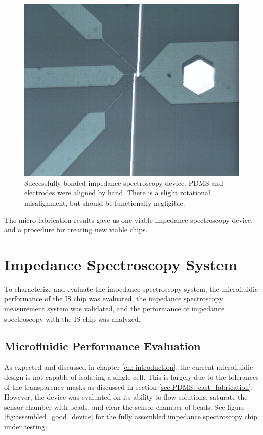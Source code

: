 \begin{figure}[h]
    \centering
    \includegraphics[width=\textwidth]{images/good_device.png}
    \caption{Successfully bonded impedance spectroscopy device. PDMS and electrodes were aligned by hand. There is a slight rotational misalignment, but should be functionally negligible.}
    \label{fig:good_device}
\end{figure}

\par The micro-fabrication results gave us one viable impedance spectroscopy device, and a procedure for creating new viable chips.

\FloatBarrier

\section{Impedance Spectroscopy System}

\par To characterize and evaluate the impedance spectroscopy system, the microfluidic performance of the IS chip was evaluated, the impedance spectroscopy measurement system was validated, and the performance of impedance spectroscopy with the IS chip was analyzed. 

\subsection{Microfluidic Performance Evaluation}

\par As expected and discussed in chapter \ref{ch: introduction}, the current microfluidic design is not capable of isolating a single cell. This is largely due to the tolerances of the transparency masks as discussed in section \ref{sec:PDMS_cast_fabrication}. However, the device was evaluated on its ability to flow solutions, saturate the sensor chamber with beads, and clear the sensor chamber of beads. See figure \ref{fig:assembled_good_device} for the fully assembled impedance spectroscopy chip under testing. 

